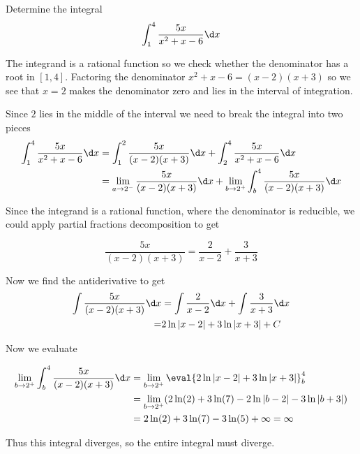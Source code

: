 \documentclass{ximera}
\begin{document}
\begin{example}
Determine the integral
\[
\int_{1}^{4} \frac{5x}{x^{2}+x-6} \d x 
\]


\begin{explanation}
 The integrand is a rational function so we check whether the denominator has a root in $[1,4]$. 
Factoring the denominator $x^{2}+x-6=(x-2)(x+3)$ so we see that $x=2$ makes the denominator zero 
and lies in the interval of integration. 

Since $2$ lies in the middle of the interval we need to break the integral into two pieces
\begin{align*}
\int_{1}^{4} \frac{5x}{x^{2}+x-6} \d x &= \int_{1}^{2} \frac{5x}{(x-2)(x+3)} \d x  + \int_{2}^{4} \frac{5x}{x^{2}+x-6} \d x \\
      &=\lim_{a \to 2^{-}} \frac{5x}{(x-2)(x+3)} \d x + \lim_{b \to 2^{+}} \int_{b}^{4} \frac{5x}{(x-2)(x+3)} \d x
\end{align*}

Since the integrand is a rational function, where the denominator is reducible, we could apply partial fractions decomposition to get

\[
\frac{5x}{(x-2)(x+3)}=\frac{ 2}{x-2} +\frac{ 3}{x+3}
\]


Now we find the antiderivative to get 
\begin{align*}
\int \frac{5x}{(x-2)(x+3)} \d x&=\int \frac{ 2}{x-2} \d x + \int \frac{ 3}{x+3} \d x \\
=& 2\ln|x-2| + 3\ln|x+3 | + C
\end{align*}


Now we evaluate 

\begin{align*}
\lim_{b \to 2^{+}} \int_{b}^{4} \frac{5x}{(x-2)(x+3)} \d x&= \lim_{b \to 2^{+}} \eval{ 2\ln|x-2| + 3\ln|x+3 | }_{b}^{4} \\
&=\lim_{b \to 2^{+}} (2\ln(2) + 3 \ln(7) - 2\ln|b-2| -3\ln|b+3| ) \\
&=2\ln(2) +3\ln(7)-3\ln(5) + \infty=\infty
\end{align*}

Thus this integral diverges, so the entire integral must diverge. 

\end{explanation}
\end{example}



\end{document}
